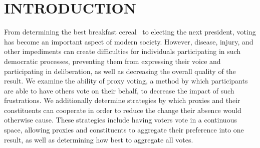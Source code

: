 %
%

\chapter{INTRODUCTION}\label{ch:introduction}
\thispagestyle{empty}
From determining the best breakfast cereal~\cite{Curtis2021} to electing the next
president, voting has become an important aspect of modern society.
However, disease, injury, and other impediments can create difficulties for individuals
participating in such democratic processes, preventing them from expressing their
voice and participating in deliberation, as well as decreasing the overall quality of
the result.
We examine the ability of proxy voting, a method by which participants are able to
have others vote on their behalf, to decrease the impact of such frustrations.
We additionally determine strategies by which proxies and their constituents can
cooperate in order to reduce the change their absence would otherwise cause.
These strategies include having voters vote in a continuous space, allowing proxies
and constituents to aggregate their preference into one result, as well as
determining how best to aggregate all votes.

